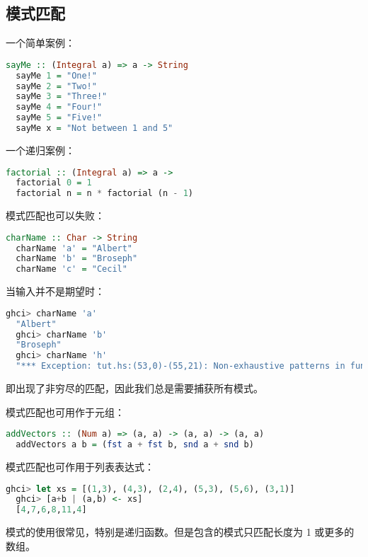 \documentclass[./main.tex]{subfiles}
\begin{document}
\subsection*{模式匹配}

一个简单案例：

\begin{lstlisting}[language=Haskell]
  sayMe :: (Integral a) => a -> String
  sayMe 1 = "One!"
  sayMe 2 = "Two!"
  sayMe 3 = "Three!"
  sayMe 4 = "Four!"
  sayMe 5 = "Five!"
  sayMe x = "Not between 1 and 5"
\end{lstlisting}

一个递归案例：

\begin{lstlisting}[language=Haskell]
  factorial :: (Integral a) => a ->
  factorial 0 = 1
  factorial n = n * factorial (n - 1)
\end{lstlisting}

模式匹配也可以失败：

\begin{lstlisting}[language=Haskell]
  charName :: Char -> String
  charName 'a' = "Albert"
  charName 'b' = "Broseph"
  charName 'c' = "Cecil"
\end{lstlisting}

当输入并不是期望时：

\begin{lstlisting}[language=Haskell]
  ghci> charName 'a'
  "Albert"
  ghci> charName 'b'
  "Broseph"
  ghci> charName 'h'
  "*** Exception: tut.hs:(53,0)-(55,21): Non-exhaustive patterns in function charName
\end{lstlisting}

即出现了非穷尽的匹配，因此我们总是需要捕获所有模式。

模式匹配也可用作于元组：

\begin{lstlisting}[language=Haskell]
  addVectors :: (Num a) => (a, a) -> (a, a) -> (a, a)
  addVectors a b = (fst a + fst b, snd a + snd b)
\end{lstlisting}

模式匹配也可作用于列表表达式：

\begin{lstlisting}[language=Haskell]
  ghci> let xs = [(1,3), (4,3), (2,4), (5,3), (5,6), (3,1)]
  ghci> [a+b | (a,b) <- xs]
  [4,7,6,8,11,4]
\end{lstlisting}

\begin{anote}
   模式的使用很常见，特别是递归函数。但是包含\acode{:}的模式只匹配长度为 1 或更多的数组。
\end{anote}
\end{document}
